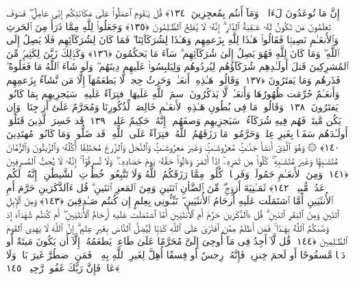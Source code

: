  إِنَّ مَا تُوعَدُونَ لَءَاتٍۢ ۖ وَمَآ أَنتُم بِمُعجِزِينَ ﴿١٣٤﴾
 قُل يَـٰقَومِ ٱعمَلُوا۟ عَلَىٰ مَكَانَتِكُم إِنِّى عَامِلٌۭ ۖ فَسَوفَ تَعلَمُونَ مَن تَكُونُ لَهُۥ عَـٰقِبَةُ ٱلدَّارِ ۗ إِنَّهُۥ لَا يُفلِحُ ٱلظَّـٰلِمُونَ ﴿١٣٥﴾
 وَجَعَلُوا۟ لِلَّهِ مِمَّا ذَرَأَ مِنَ ٱلحَرثِ وَٱلأَنعَـٰمِ نَصِيبًۭا فَقَالُوا۟ هَـٰذَا لِلَّهِ بِزَعمِهِم وَهَـٰذَا لِشُرَكَآئِنَا ۖ فَمَا كَانَ لِشُرَكَآئِهِم فَلَا يَصِلُ إِلَى ٱللَّهِ ۖ وَمَا كَانَ لِلَّهِ فَهُوَ يَصِلُ إِلَىٰ شُرَكَآئِهِم ۗ سَآءَ مَا يَحكُمُونَ ﴿١٣٦﴾
 وَكَذَٟلِكَ زَيَّنَ لِكَثِيرٍۢ مِّنَ ٱلمُشرِكِينَ قَتلَ أَولَـٰدِهِم شُرَكَآؤُهُم لِيُردُوهُم وَلِيَلبِسُوا۟ عَلَيهِم دِينَهُم ۖ وَلَو شَآءَ ٱللَّهُ مَا فَعَلُوهُ ۖ فَذَرهُم وَمَا يَفتَرُونَ ﴿١٣٧﴾
 وَقَالُوا۟ هَـٰذِهِۦٓ أَنعَـٰمٌۭ وَحَرثٌ حِجرٌۭ لَّا يَطعَمُهَآ إِلَّا مَن نَّشَآءُ بِزَعمِهِم وَأَنعَـٰمٌ حُرِّمَت ظُهُورُهَا وَأَنعَـٰمٌۭ لَّا يَذكُرُونَ ٱسمَ ٱللَّهِ عَلَيهَا ٱفتِرَآءً عَلَيهِ ۚ سَيَجزِيهِم بِمَا كَانُوا۟ يَفتَرُونَ ﴿١٣٨﴾
 وَقَالُوا۟ مَا فِى بُطُونِ هَـٰذِهِ ٱلأَنعَـٰمِ خَالِصَةٌۭ لِّذُكُورِنَا وَمُحَرَّمٌ عَلَىٰٓ أَزوَٟجِنَا ۖ وَإِن يَكُن مَّيتَةًۭ فَهُم فِيهِ شُرَكَآءُ ۚ سَيَجزِيهِم وَصفَهُم ۚ إِنَّهُۥ حَكِيمٌ عَلِيمٌۭ ﴿١٣٩﴾
 قَد خَسِرَ ٱلَّذِينَ قَتَلُوٓا۟ أَولَـٰدَهُم سَفَهًۢا بِغَيرِ عِلمٍۢ وَحَرَّمُوا۟ مَا رَزَقَهُمُ ٱللَّهُ ٱفتِرَآءً عَلَى ٱللَّهِ ۚ قَد ضَلُّوا۟ وَمَا كَانُوا۟ مُهتَدِينَ ﴿١٤٠﴾
 ۞ وَهُوَ ٱلَّذِىٓ أَنشَأَ جَنَّـٰتٍۢ مَّعرُوشَـٰتٍۢ وَغَيرَ مَعرُوشَـٰتٍۢ وَٱلنَّخلَ وَٱلزَّرعَ مُختَلِفًا أُكُلُهُۥ وَٱلزَّيتُونَ وَٱلرُّمَّانَ مُتَشَـٰبِهًۭا وَغَيرَ مُتَشَـٰبِهٍۢ ۚ كُلُوا۟ مِن ثَمَرِهِۦٓ إِذَآ أَثمَرَ وَءَاتُوا۟ حَقَّهُۥ يَومَ حَصَادِهِۦ ۖ وَلَا تُسرِفُوٓا۟ ۚ إِنَّهُۥ لَا يُحِبُّ ٱلمُسرِفِينَ ﴿١٤١﴾
 وَمِنَ ٱلأَنعَـٰمِ حَمُولَةًۭ وَفَرشًۭا ۚ كُلُوا۟ مِمَّا رَزَقَكُمُ ٱللَّهُ وَلَا تَتَّبِعُوا۟ خُطُوَٟتِ ٱلشَّيطَٰنِ ۚ إِنَّهُۥ لَكُم عَدُوٌّۭ مُّبِينٌۭ ﴿١٤٢﴾
 ثَمَـٰنِيَةَ أَزوَٟجٍۢ ۖ مِّنَ ٱلضَّأنِ ٱثنَينِ وَمِنَ ٱلمَعزِ ٱثنَينِ ۗ قُل ءَآلذَّكَرَينِ حَرَّمَ أَمِ ٱلأُنثَيَينِ أَمَّا ٱشتَمَلَت عَلَيهِ أَرحَامُ ٱلأُنثَيَينِ ۖ نَبِّـُٔونِى بِعِلمٍ إِن كُنتُم صَـٰدِقِينَ ﴿١٤٣﴾
 وَمِنَ ٱلإِبِلِ ٱثنَينِ وَمِنَ ٱلبَقَرِ ٱثنَينِ ۗ قُل ءَآلذَّكَرَينِ حَرَّمَ أَمِ ٱلأُنثَيَينِ أَمَّا ٱشتَمَلَت عَلَيهِ أَرحَامُ ٱلأُنثَيَينِ ۖ أَم كُنتُم شُهَدَآءَ إِذ وَصَّىٰكُمُ ٱللَّهُ بِهَـٰذَا ۚ فَمَن أَظلَمُ مِمَّنِ ٱفتَرَىٰ عَلَى ٱللَّهِ كَذِبًۭا لِّيُضِلَّ ٱلنَّاسَ بِغَيرِ عِلمٍ ۗ إِنَّ ٱللَّهَ لَا يَهدِى ٱلقَومَ ٱلظَّـٰلِمِينَ ﴿١٤٤﴾
 قُل لَّآ أَجِدُ فِى مَآ أُوحِىَ إِلَىَّ مُحَرَّمًا عَلَىٰ طَاعِمٍۢ يَطعَمُهُۥٓ إِلَّآ أَن يَكُونَ مَيتَةً أَو دَمًۭا مَّسفُوحًا أَو لَحمَ خِنزِيرٍۢ فَإِنَّهُۥ رِجسٌ أَو فِسقًا أُهِلَّ لِغَيرِ ٱللَّهِ بِهِۦ ۚ فَمَنِ ٱضطُرَّ غَيرَ بَاغٍۢ وَلَا عَادٍۢ فَإِنَّ رَبَّكَ غَفُورٌۭ رَّحِيمٌۭ ﴿١٤٥﴾
